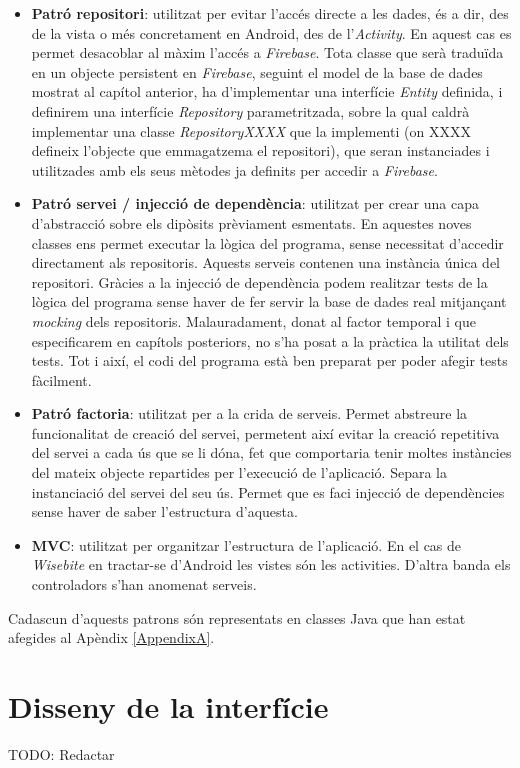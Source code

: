 \begin{itemize}
\item \textbf{Patró repositori}: utilitzat per evitar l'accés directe a les dades, és a dir, des de la vista o més concretament en Android, des de l'\textit{Activity}. En aquest cas es permet desacoblar al màxim l'accés a \textit{Firebase}. Tota classe que serà traduïda en un objecte persistent en \textit{Firebase}, seguint el model de la base de dades mostrat al capítol anterior, ha d'implementar una interfície \textit{Entity} definida, i definirem una interfície \textit{Repository} parametritzada, sobre la qual caldrà implementar una classe \textit{RepositoryXXXX} que la implementi (on XXXX defineix l'objecte que emmagatzema el repositori), que seran instanciades i utilitzades amb els seus mètodes ja definits per accedir a \textit{Firebase}.

\item \textbf{Patró servei / injecció de dependència}: utilitzat per crear una capa d'abstracció sobre els dipòsits prèviament esmentats. En aquestes noves classes ens permet executar la lògica del programa, sense necessitat d'accedir directament als repositoris. Aquests serveis contenen una instància única del repositori. Gràcies a la injecció de dependència podem realitzar tests de la lògica del programa sense haver de fer servir la base de dades real mitjançant \textit{mocking} dels repositoris. Malauradament, donat al factor temporal i que especificarem en capítols posteriors, no s'ha posat a la pràctica la utilitat dels tests. Tot i així, el codi del programa està ben preparat per poder afegir tests fàcilment.

\item \textbf{Patró factoria}: utilitzat per a la crida de serveis. Permet abstreure la funcionalitat de creació del servei, permetent així evitar la creació repetitiva del servei a cada ús que se li dóna, fet que comportaria tenir moltes instàncies del mateix objecte repartides per l'execució de l'aplicació. Separa la instanciació del servei del seu ús. Permet que es faci injecció de dependències sense haver de saber l'estructura d'aquesta.

\item \textbf{MVC}: utilitzat per organitzar l'estructura de l'aplicació. En el cas de \textit{Wisebite} en tractar-se d'Android les vistes són les activities. D'altra banda els controladors s'han anomenat serveis.
\end{itemize}

\noindent Cadascun d'aquests patrons són representats en classes Java que han estat afegides al Apèndix \ref{AppendixA}.


\section{Disseny de la interfície}

TODO: Redactar
